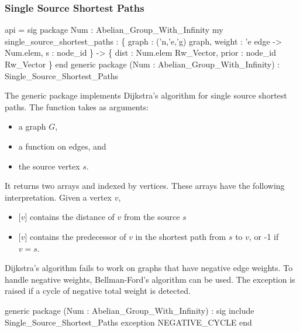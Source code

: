 \subsubsection{Single Source Shortest Paths}
\begin{SML}
 api  = sig 
   package Num : Abelian_Group_With_Infinity
   my single_source_shortest_paths :
                 \{ graph : ('n,'e,'g) graph,
                   weight : 'e edge -> Num.elem,
                   s : node_id
                 \} ->
                 \{ dist : Num.elem Rw_Vector,
                   prior :  node_id Rw_Vector
                 \}
 end
 generic package (Num : Abelian_Group_With_Infinity) 
    : Single_Source_Shortest_Paths
\end{SML}
The generic package  implements Dijkstra's algorithm
for single source shortest paths.  The function \linebreak
{} takes as arguments: 
\begin{itemize}
\item a graph $G$, 
\item a  function on edges, and
\item the source vertex $s$.
\end{itemize}
It returns two arrays  and 
indexed by vertices.  These arrays have the following
interpretation.  Given a vertex $v$,
\begin{itemize}
\item {}[$v$] contains the distance of $v$ from the source $s$
\item {}[$v$] contains the predecessor of $v$ in the shortest
path from $s$ to $v$, or -1 if $v=s$.
\end{itemize}

Dijkstra's algorithm fails to work on graphs that have
negative edge weights.  
To handle negative weights, Bellman-Ford's algorithm can be used. 
The exception  is raised if a cycle of
negative total weight is detected.
\begin{SML}
 generic package (Num : Abelian_Group_With_Infinity) : sig
    include Single_Source_Shortest_Paths
    exception NEGATIVE_CYCLE
 end
\end{SML}
